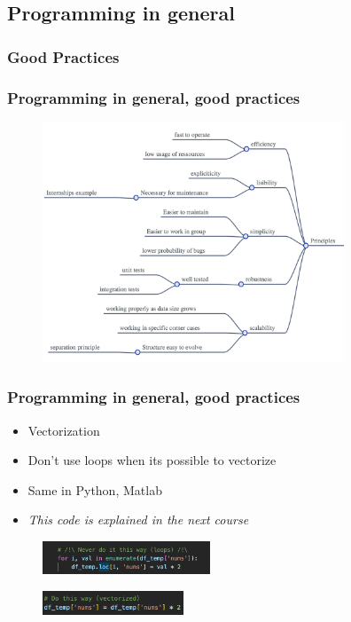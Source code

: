 \subsection{Programming in general}

\subsubsection{Good Practices}

\begin{frame}\frametitle{Programming in general, good practices}
   \begin{figure}[H]
      \includegraphics[width=9cm]{../images/illustrations/principles.png}
   \end{figure}
\end{frame}

\begin{frame}\frametitle{Programming in general, good practices}
   \begin{itemize}
      \item Vectorization
      \item Don't use loops when its possible to vectorize
      \item Same in Python, Matlab
      \item \textit{This code is explained in the next course}
   \end{itemize}

   \begin{figure}[H]
      \includegraphics[width=5cm]{../images/illustrations/mult_loop.png}
   \end{figure}

   \begin{figure}[H]
      \includegraphics[width=4.2cm]{../images/illustrations/mult_vectorized.png}
   \end{figure}
\end{frame}


